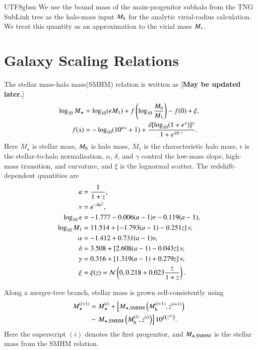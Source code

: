 \documentclass[trackchanges, twocolappendix, twocolumn]{aastex701}
\newcommand{\czkong}[1]{{\color{magenta}[\textbf{#1}]}}
\begin{document}
\begin{CJK*}{UTF8}{gbsn}
We use the bound mass of the main-progenitor subhalo from the TNG SubLink tree as the halo-mass input \(M_{\rm h}\) for the analytic virial-radius calculation. We treat this quantity as an approximation to the virial mass \(M_{\rm v}\).

\section{Galaxy Scaling Relations} \label{appendix:galaxy}

The stellar mass-halo mass(SMHM) relation is written as \czkong{May be updated later.}
\begin{align}
\log_{10} M_{\star} & = \log_{10} (\epsilon M_1) + f \left( \log_{10} \dfrac{M_{\rm h}}{M_1} \right) - f(0) + \xi , \\
f (x) & = - \log_{10} (10^{\alpha x} + 1) + \dfrac{\delta [\log_{10} (1 + e^x)]^\gamma}{1 + e^{10^{-x}}} .
\end{align}
Here $M_{\star}$ is stellar mass, $M_{\rm h}$ is halo mass, $M_1$ is the characteristic halo mass, $\epsilon$ is the stellar-to-halo normalisation, $\alpha$, $\delta$, and $\gamma$ control the low-mass slope, high-mass transition, and curvature, and $\xi$ is the lognormal scatter. The redshift-dependent quantities are
\begin{align}
a & = \dfrac{1}{1 + z} , \\
\nu & = e^{- 4 a^2},\\
\log_{10} \epsilon & = - 1.777 - 0.006 (a - 1) \nu -0.119 (a - 1) , \\
\log_{10} M_1 & = 11.514 + \left[ - 1.793 (a - 1) - 0.251 z \right] \nu , \\
\alpha & = -1.412 + 0.731 (a - 1) \nu , \\
\delta
&= 3.508+\left[2.608(a-1)-0.043z\right]\nu,\\
\gamma
&= 0.316+\left[1.319(a-1)+0.279z\right]\nu,\\
\xi & = \xi (z) = {\cal N} \left( 0, 0.218 + 0.023 \dfrac{z}{1 + z} \right) .
\end{align}

Along a merger-tree branch, stellar mass is grown self-consistently using
\begin{align}
M_\star^{(i + 1)} & = M_\star^{(i)} + \left[
M_{\star, {\rm SMHM}} \left( M_{\rm h}^{(i + 1)}, z^{(i + 1)} \right) \notag \right. \\
& - \left. M_{\star, {\rm SMHM}} \left( M_{\rm h}^{(i)}, z^{(i)} \right) \right] 10^{\xi \left( z^{(i)} \right)}.
\end{align}
Here the superscript $(i)$ denotes the first progenitor, and $M_{\star, {\rm SMHM}}$ is the stellar mass from the SMHM relation.


\end{CJK*}
\end{document}
